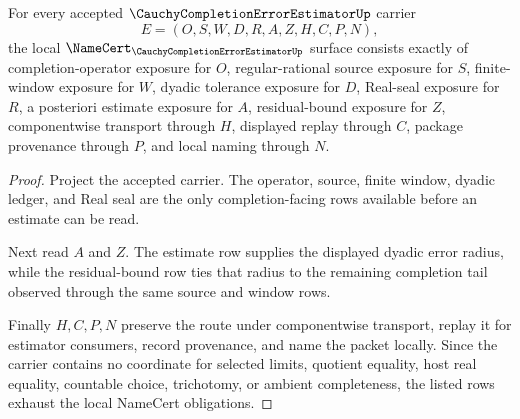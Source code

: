 \begin{theorem}
\label{thm:cauchy-completion-error-estimator-namecert-obligations}
For every accepted $\CauchyCompletionErrorEstimatorUp$ carrier
$$
E=(O,S,W,D,R,A,Z,H,C,P,N),
$$
the local $\NameCert_{\CauchyCompletionErrorEstimatorUp}$ surface consists exactly of completion-operator exposure for $O$, regular-rational source exposure for $S$, finite-window exposure for $W$, dyadic tolerance exposure for $D$, Real-seal exposure for $R$, a posteriori estimate exposure for $A$, residual-bound exposure for $Z$, componentwise transport through $H$, displayed replay through $C$, package provenance through $P$, and local naming through $N$.
\end{theorem}
\begin{proof}
Project the accepted carrier. The operator, source, finite window, dyadic ledger, and Real seal are the only completion-facing rows available before an estimate can be read.

Next read $A$ and $Z$. The estimate row supplies the displayed dyadic error radius, while the residual-bound row ties that radius to the remaining completion tail observed through the same source and window rows.

Finally $H,C,P,N$ preserve the route under componentwise transport, replay it for estimator consumers, record provenance, and name the packet locally. Since the carrier contains no coordinate for selected limits, quotient equality, host real equality, countable choice, trichotomy, or ambient completeness, the listed rows exhaust the local NameCert obligations.
\end{proof}

